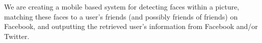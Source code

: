 We are creating a mobile based system for detecting faces within a
picture, matching these faces to a user's friends (and possibly
friends of friends) on Facebook, and outputting the retrieved user's
information from Facebook and/or Twitter.
